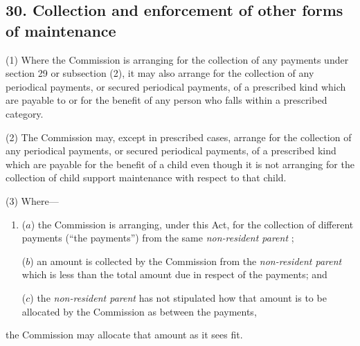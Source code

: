 \documentclass[12pt,a4paper]{article}
\begin{document}
\subsection{30. Collection and enforcement of other forms of maintenance}

(1) Where the 
Commission  %
is arranging for the collection of any payments under section 29 or subsection (2), 
it  %
may also arrange for the collection of any periodical payments, or secured periodical payments, of a prescribed kind which are payable to or for the benefit of any person who falls within a prescribed category.


(2) The 
Commission  %
may, except in prescribed cases, arrange for the collection of any periodical payments, or secured periodical payments, of a prescribed kind which are payable for the benefit of a child even though 
it  %
is not arranging for the collection of child support maintenance with respect to that child.

(3) Where—
\begin{enumerate}\item[]
($a$) the 
Commission  %
is arranging, under this Act, for the collection of different payments (“the payments”) from the same 
\emph{non-resident parent}%
;

($b$) an amount is collected by the 
Commission  %
from the 
\emph{non-resident parent}  %
which is less than the total amount due in respect of the payments; and

($c$) the 
\emph{non-resident parent}  %
has not stipulated how that amount is to be allocated by the 
Commission  %
as between the payments,
\end{enumerate}
the 
Commission  %
may allocate that amount as 
it  %
sees fit.
\end{document}
